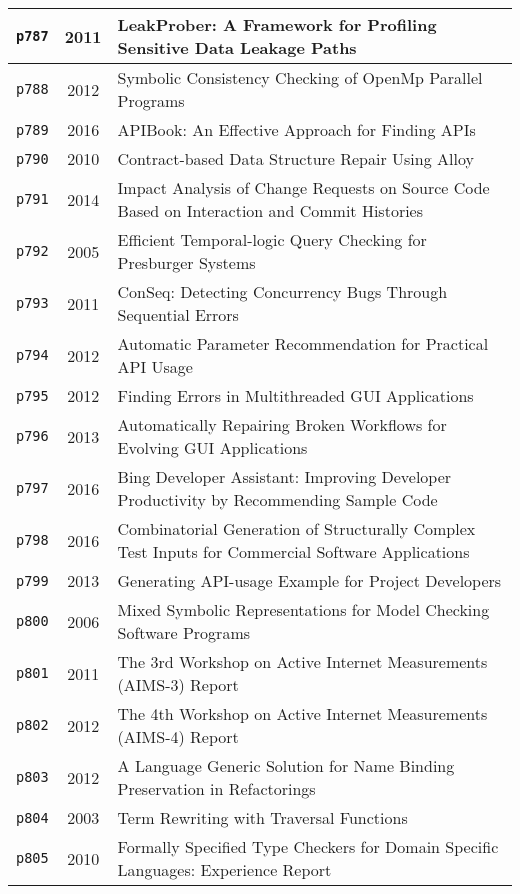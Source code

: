 \begin{longtable}{| c | c | p{16cm} |}
  \hline
  \texttt{p787} & 2011 & LeakProber: A Framework for Profiling Sensitive Data Leakage Paths \\
  \hline
  \texttt{p788} & 2012 & Symbolic Consistency Checking of OpenMp Parallel Programs \\
  \hline
  \texttt{p789} & 2016 & APIBook: An Effective Approach for Finding APIs \\
  \hline
  \texttt{p790} & 2010 & Contract-based Data Structure Repair Using Alloy \\
  \hline
  \texttt{p791} & 2014 & Impact Analysis of Change Requests on Source Code Based on Interaction and Commit Histories \\
  \hline
  \texttt{p792} & 2005 & Efficient Temporal-logic Query Checking for Presburger Systems \\
  \hline
  \texttt{p793} & 2011 & ConSeq: Detecting Concurrency Bugs Through Sequential Errors \\
  \hline
  \texttt{p794} & 2012 & Automatic Parameter Recommendation for Practical API Usage \\
  \hline
  \texttt{p795} & 2012 & Finding Errors in Multithreaded GUI Applications \\
  \hline
  \texttt{p796} & 2013 & Automatically Repairing Broken Workflows for Evolving GUI Applications \\
  \hline
  \texttt{p797} & 2016 & Bing Developer Assistant: Improving Developer Productivity by Recommending Sample Code \\
  \hline
  \texttt{p798} & 2016 & Combinatorial Generation of Structurally Complex Test Inputs for Commercial Software Applications \\
  \hline
  \texttt{p799} & 2013 & Generating API-usage Example for Project Developers \\
  \hline
  \texttt{p800} & 2006 & Mixed Symbolic Representations for Model Checking Software Programs \\
  \hline
  \texttt{p801} & 2011 & The 3rd Workshop on Active Internet Measurements (AIMS-3) Report \\
  \hline
  \texttt{p802} & 2012 & The 4th Workshop on Active Internet Measurements (AIMS-4) Report \\
  \hline
  \texttt{p803} & 2012 & A Language Generic Solution for Name Binding Preservation in Refactorings \\
  \hline
  \texttt{p804} & 2003 & Term Rewriting with Traversal Functions \\
  \hline
  \texttt{p805} & 2010 & Formally Specified Type Checkers for Domain Specific Languages: Experience Report \\

\end{longtable}
